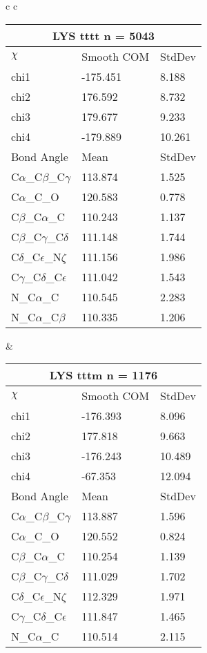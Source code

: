 \begin{longtable}{ c c }
\begin{tabular}{ l l l }
  \toprule
  \multicolumn{3}{c}{LYS \textbf{tttt} n = 5043} \\ \toprule
  $\chi$       & Smooth COM & StdDev \\ \midrule
  chi1 & -175.451 & 8.188 \\ 
  chi2 & 176.592 & 8.732 \\ 
  chi3 & 179.677 & 9.233 \\ 
  chi4 & -179.889 & 10.261 \\ \midrule
  Bond Angle   & Mean     & StdDev \\ \midrule
  C$\alpha$\_C$\beta$\_C$\gamma$ & 113.874 & 1.525\\
  C$\alpha$\_C\_O & 120.583 & 0.778\\
  C$\beta$\_C$\alpha$\_C & 110.243 & 1.137\\
  C$\beta$\_C$\gamma$\_C$\delta$ & 111.148 & 1.744\\
  C$\delta$\_C$\epsilon$\_N$\zeta$ & 111.156 & 1.986\\
  C$\gamma$\_C$\delta$\_C$\epsilon$ & 111.042 & 1.543\\
  N\_C$\alpha$\_C & 110.545 & 2.283\\
  N\_C$\alpha$\_C$\beta$ & 110.335 & 1.206\\
  \bottomrule
  \end{tabular}
  &
  \begin{tabular}{ l l l }
  \toprule
  \multicolumn{3}{c}{LYS \textbf{tttm} n = 1176} \\ \toprule
  $\chi$       & Smooth COM & StdDev \\ \midrule
  chi1 & -176.393 & 8.096 \\ 
  chi2 & 177.818 & 9.663 \\ 
  chi3 & -176.243 & 10.489 \\ 
  chi4 & -67.353 & 12.094 \\ \midrule
  Bond Angle   & Mean     & StdDev \\ \midrule
  C$\alpha$\_C$\beta$\_C$\gamma$ & 113.887 & 1.596\\
  C$\alpha$\_C\_O & 120.552 & 0.824\\
  C$\beta$\_C$\alpha$\_C & 110.254 & 1.139\\
  C$\beta$\_C$\gamma$\_C$\delta$ & 111.029 & 1.702\\
  C$\delta$\_C$\epsilon$\_N$\zeta$ & 112.329 & 1.971\\
  C$\gamma$\_C$\delta$\_C$\epsilon$ & 111.847 & 1.465\\
  N\_C$\alpha$\_C & 110.514 & 2.115\\

\end{tabular}
\end{longtable}
